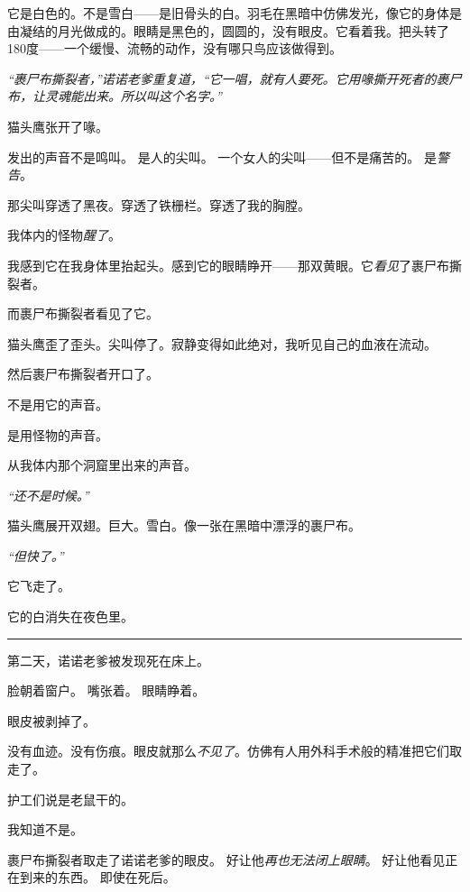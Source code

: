 \noindent 它是白色的。不是雪白——是旧骨头的白。羽毛在黑暗中仿佛发光，像它的身体是由凝结的月光做成的。眼睛是黑色的，圆圆的，没有眼皮。它看着我。把头转了180度——一个缓慢、流畅的动作，没有哪只鸟应该做得到。

\noindent \textit{“裹尸布撕裂者，”诺诺老爹重复道，“它一唱，就有人要死。它用喙撕开死者的裹尸布，让灵魂能出来。所以叫这个名字。”}

\noindent 猫头鹰张开了喙。

\noindent 发出的声音不是鸣叫。
是人的尖叫。
一个女人的尖叫——但不是痛苦的。
是\textit{警告}。

\noindent 那尖叫穿透了黑夜。穿透了铁栅栏。穿透了我的胸膛。

\noindent 我体内的怪物\textit{醒了}。

\noindent 我感到它在我身体里抬起头。感到它的眼睛睁开——那双黄眼。它\textit{看见}了裹尸布撕裂者。

\noindent 而裹尸布撕裂者看见了它。

\noindent 猫头鹰歪了歪头。尖叫停了。寂静变得如此绝对，我听见自己的血液在流动。

\noindent 然后裹尸布撕裂者开口了。

\noindent 不是用它的声音。

\noindent 是用怪物的声音。

\noindent 从我体内那个洞窟里出来的声音。

\noindent \textit{“还不是时候。”}

\noindent 猫头鹰展开双翅。巨大。雪白。像一张在黑暗中漂浮的裹尸布。

\noindent \textit{“但快了。”}

\noindent 它飞走了。

\noindent 它的白消失在夜色里。

\vspace{0.5em}\noindent\rule{\textwidth}{0.5pt}\vspace{0.5em}

\noindent 第二天，诺诺老爹被发现死在床上。

\noindent 脸朝着窗户。
嘴张着。
眼睛睁着。

\noindent 眼皮被剥掉了。

\noindent 没有血迹。没有伤痕。眼皮就那么\textit{不见了}。仿佛有人用外科手术般的精准把它们取走了。

\noindent 护工们说是老鼠干的。

\noindent 我知道不是。

\noindent 裹尸布撕裂者取走了诺诺老爹的眼皮。
好让他\textit{再也无法闭上眼睛}。
好让他看见正在到来的东西。
即使在死后。


